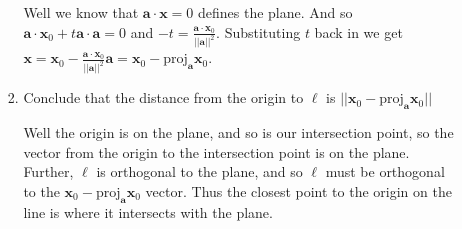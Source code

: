 \documentclass[letterpaper]{article}
\begin{document}
\begin{enumerate}
\begin{enumerate}
\begin{enumerate}
      Well we know that $\mathbf{a}\cdot\mathbf{x}=0$ defines the plane. And so $\mathbf{a}\cdot\mathbf{x}_0+t\mathbf{a}\cdot\mathbf{a}=0$ and $-t=\frac{\mathbf{a}\cdot\mathbf{x}_0}{||\mathbf{a}||^2}$. Substituting $t$ back in we get $\mathbf{x}=\mathbf{x}_0-\frac{\mathbf{a}\cdot\mathbf{x}_0}{||\mathbf{a}||^2}\mathbf{a}=\mathbf{x}_0-\text{proj}_{\mathbf{a}}\mathbf{x}_0$.
    \item
      Conclude that the distance from the origin to $\ell$ is $||\mathbf{x}_0-\text{proj}_{\mathbf{a}}\mathbf{x}_0||$

      Well the origin is on the plane, and so is our intersection point, so the vector from the origin to the intersection point is on the plane. Further, $\ell$ is orthogonal to the plane, and so $\ell$ must be orthogonal to the $\mathbf{x}_0-\text{proj}_{\mathbf{a}}\mathbf{x}_0$ vector. Thus the closest point to the origin on the line is where it intersects with the plane.
    \end{enumerate}
  \end{enumerate}
\end{enumerate}
\end{document}
